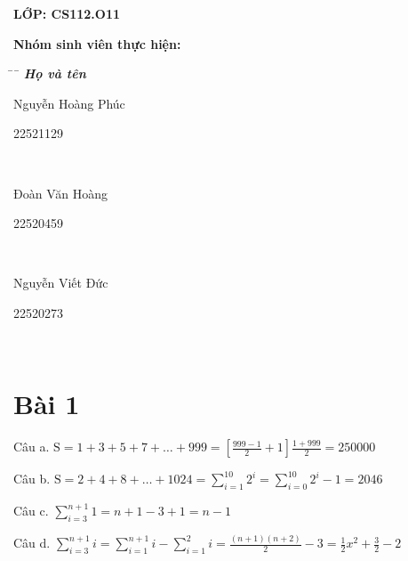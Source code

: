 \documentclass{article}
\newcommand\tab[1][1cm]{\hspace*{#1}}
\begin{document}
\begin{titlepage}
    
    \vspace{15pt}
    \textbf{LỚP: CS112.O11}
    
    \vspace{10pt}
    \textbf{Nhóm sinh viên thực hiện:}
    \begin{tabbing}
    \hspace{9cm}\=\hspace{3cm}\=\ \kill
    {\it \textbf{Họ và tên}}\>\\
    \begin{bfseries}Nguyễn Hoàng Phúc\end{bfseries}\> \begin{bfseries}22521129\end{bfseries}\\
    \begin{bfseries}Đoàn Văn Hoàng\end{bfseries}\> \begin{bfseries}22520459\end{bfseries}\\
    \begin{bfseries}Nguyễn Viết Đức\end{bfseries}\> \begin{bfseries}22520273\end{bfseries}\\
    \end{tabbing}
    \vspace{10pt}
    \end{titlepage}
\newpage
\section*{Bài 1}

\vspace{5mm}
Câu a. 
\tab \(\text{S} = 1 + 3 + 5 + 7 +\dots + 999 = [\frac{999 - 1}{2} + 1]\frac{1+999}{2} = 250000\)

\vspace{5mm}
Câu b. 
\tab \(\text{S} = 2 + 4 + 8 + \dots + 1024 = \sum\limits_{i=1}^{10}{2^i} = \sum\limits_{i=0}^{10}{2^i} - 1 = 2046 \)

\vspace{5mm}
Câu c. 
\tab \(\sum\limits_{i=3}^{n+1}{1} = n+1-3+1 = n-1\)


\vspace{5mm}
Câu d. 
\tab \(\sum\limits_{i=3}^{n+1}{i} = \sum\limits_{i=1}^{n+1}{i} - \sum\limits_{i=1}^{2}{i} = \frac{(n+1)(n+2)}{2} - 3 = \frac{1}{2}x^2 + \frac{3}{2} - 2 \)
\end{document}
